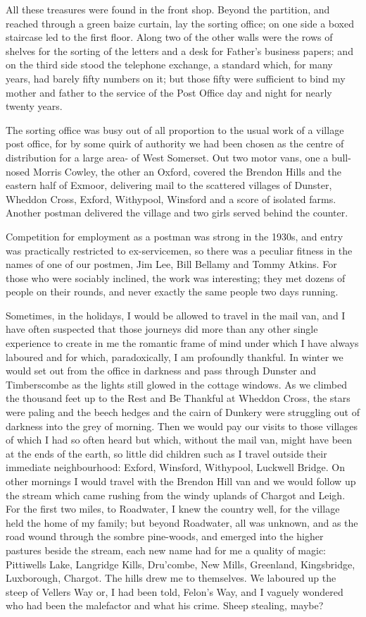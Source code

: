 All these treasures were found in the front shop. Beyond the partition, and reached through a green baize curtain, lay the sorting office; on one side a boxed staircase led to the first floor. Along two of the other walls were the rows of shelves for the sorting of the letters and a desk for Father's business papers; and on the third side stood the telephone exchange, a standard which, for many years, had barely fifty numbers on it; but those fifty were sufficient to bind my mother and father to the service of the Post Office day and night for nearly twenty years.

The sorting office was busy out of all proportion to the usual work of a village post office, for by some quirk of authority we had been chosen as the centre of distribution for a large area- of West Somerset. Out two motor vans, one a bull-nosed Morris Cowley, the other an Oxford, covered the Brendon Hills and the eastern half of Exmoor, delivering mail to the scattered villages of Dunster, Wheddon Cross, Exford, Withypool, Winsford and a score of isolated farms. Another postman delivered the village and two girls served behind the counter.

Competition for employment as a postman was strong in the 1930s, and entry was practically restricted to ex-servicemen, so there was a peculiar fitness in the names of one of our postmen, Jim Lee, Bill Bellamy and Tommy Atkins. For those who were sociably inclined, the work was interesting; they met dozens of people on their rounds, and never exactly the same people two days running.

Sometimes, in the holidays, I would be allowed to travel in the mail van, and I have often suspected that those journeys did more than any other single experience to create in me the romantic frame of mind under which I have always laboured and for which, paradoxically, I am profoundly thankful. In winter we would set out from the office in darkness and pass through Dunster and Timberscombe as the lights still glowed in the cottage windows. As we climbed the thousand feet up to the Rest and Be Thankful at Wheddon Cross, the stars were paling and the beech hedges and the cairn of Dunkery were struggling out of darkness into the grey of morning. Then we would pay our visits to those villages of which I had so often heard but which, without the mail van, might have been at the ends of the earth, so little did children such as I travel outside their immediate neighbourhood: Exford, Winsford, Withypool, Luckwell Bridge. On other mornings I would travel with the Brendon Hill van and we would follow up the stream which came rushing from the windy uplands of Chargot and Leigh. For the first two miles, to Roadwater, I knew the country well, for the village held the home of my family; but beyond Roadwater, all was unknown, and as the road wound through the sombre pine-woods, and emerged into the higher pastures beside the stream, each new name had for me a quality of magic: Pittiwells Lake, Langridge Kills, Dru'combe, New Mills, Greenland, Kingsbridge, Luxborough, Chargot. The hills drew me to themselves. We laboured up the steep of Vellers Way or, I had been told, Felon's Way, and I vaguely wondered who had been the malefactor and what his crime. Sheep stealing, maybe?

